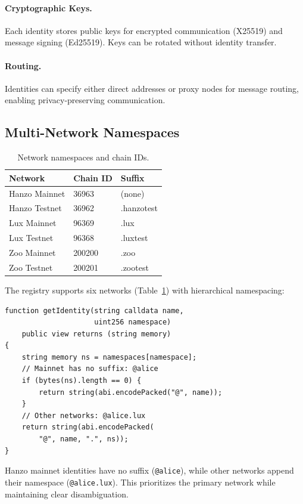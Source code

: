 \paragraph{Cryptographic Keys.} Each identity stores public keys for encrypted communication (X25519) and message signing (Ed25519). Keys can be rotated without identity transfer.

\paragraph{Routing.} Identities can specify either direct addresses or proxy nodes for message routing, enabling privacy-preserving communication.

\subsection{Multi-Network Namespaces}

\begin{table}[h]
\centering
\caption{Network namespaces and chain IDs.}
\label{tab:namespaces}
\begin{tabular}{lll}
\toprule
\textbf{Network} & \textbf{Chain ID} & \textbf{Suffix} \\
\midrule
Hanzo Mainnet & 36963 & (none) \\
Hanzo Testnet & 36962 & .hanzotest \\
Lux Mainnet & 96369 & .lux \\
Lux Testnet & 96368 & .luxtest \\
Zoo Mainnet & 200200 & .zoo \\
Zoo Testnet & 200201 & .zootest \\
\bottomrule
\end{tabular}
\end{table}

The registry supports six networks (Table~\ref{tab:namespaces}) with hierarchical namespacing:

\begin{lstlisting}[language=Solidity]
function getIdentity(string calldata name,
                     uint256 namespace)
    public view returns (string memory)
{
    string memory ns = namespaces[namespace];
    // Mainnet has no suffix: @alice
    if (bytes(ns).length == 0) {
        return string(abi.encodePacked("@", name));
    }
    // Other networks: @alice.lux
    return string(abi.encodePacked(
        "@", name, ".", ns));
}
\end{lstlisting}

Hanzo mainnet identities have no suffix (\texttt{@alice}), while other networks append their namespace (\texttt{@alice.lux}). This prioritizes the primary network while maintaining clear disambiguation.

